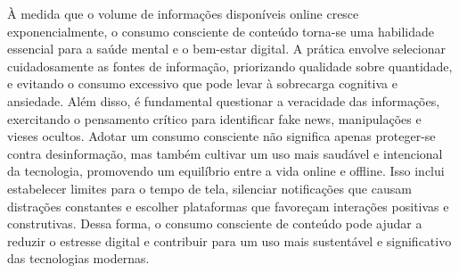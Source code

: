 À medida que o volume de informações disponíveis online cresce exponencialmente, o consumo consciente de conteúdo torna-se
uma habilidade essencial para a saúde mental e o bem-estar digital. A prática envolve selecionar cuidadosamente as fontes
de informação, priorizando qualidade sobre quantidade, e evitando o consumo excessivo que pode levar à sobrecarga cognitiva
e ansiedade. Além disso, é fundamental questionar a veracidade das informações, exercitando o pensamento crítico para
identificar fake news, manipulações e vieses ocultos. Adotar um consumo consciente não significa apenas proteger-se contra
desinformação, mas também cultivar um uso mais saudável e intencional da tecnologia, promovendo um equilíbrio entre a vida
online e offline. Isso inclui estabelecer limites para o tempo de tela, silenciar notificações que causam distrações constantes
e escolher plataformas que favoreçam interações positivas e construtivas. Dessa forma, o consumo consciente de conteúdo
pode ajudar a reduzir o estresse digital e contribuir para um uso mais sustentável e significativo das tecnologias modernas.
